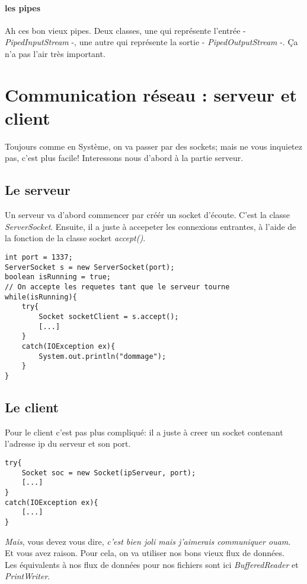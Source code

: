 \documentclass{article}
\begin{document}
\paragraph{les pipes}
Ah ces bon vieux pipes. Deux classes, une qui représente l'entrée - \emph{PipedInputStream} -, une autre qui représente la sortie - \emph{PipedOutputStream} -. Ça n'a pas l'air très important.

\section{Communication réseau : serveur et client}
Toujours comme en Système, on va passer par des sockets; mais ne vous inquietez pas, c'est plus facile! Interessons nous d'abord à la partie serveur.
\subsection{Le serveur}
Un serveur va d'abord commencer par créér un socket d'écoute. C'est la classe \emph{ServerSocket}. Ensuite, il a juste à accepeter les connexions entrantes, à l'aide de la fonction de la classe socket \emph{accept()}.\\
\begin{lstlisting}
int port = 1337;
ServerSocket s = new ServerSocket(port);
boolean isRunning = true;
// On accepte les requetes tant que le serveur tourne
while(isRunning){
	try{
		Socket socketClient = s.accept();
		[...]
	}
	catch(IOException ex){
		System.out.println("dommage");
	}
}
\end{lstlisting}

\subsection{Le client}
Pour le client c'est pas plus compliqué: il a juste à creer un socket contenant l'adresse ip du serveur et son port.
\begin{lstlisting}
try{
	Socket soc = new Socket(ipServeur, port);
	[...]
}
catch(IOException ex){
	[...]
}
\end{lstlisting}

\emph{Mais}, vous devez vous dire, \emph{c'est bien joli mais j'aimerais communiquer ouam}.\\
Et vous avez raison. Pour cela, on va utiliser nos bons vieux flux de données.\\
Les équivalents à nos flux de données pour nos fichiers sont ici \emph{BufferedReader} et \emph{PrintWriter}.\\
\end{document}
